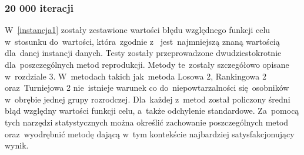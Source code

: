 \subsubsection{20 000 iteracji}
\par
W~\ref{instancja1} zostały zestawione wartości błędu względnego funkcji celu w~stosunku do~wartości, która~zgodnie z~\cite{qaplib} jest~najmniejszą znaną wartością dla~danej instancji danych. Testy zostały przeprowadzone dwudziestokrotnie dla~poszczególnych metod reprodukcji. Metody te~zostały szczegółowo opisane w~rozdziale 3. W~metodach takich jak~metoda Losowa 2, Rankingowa 2 oraz~Turniejowa 2 nie~istnieje warunek co do~niepowtarzalności się~osobników w~obrębie jednej grupy rozrodczej. Dla~każdej z~metod został policzony średni błąd względny wartości funkcji celu, a~także odchylenie standardowe. Za~pomocą tych narzędzi statystycznych można określić zachowanie poszczególnych metod oraz~wyodrębnić metodę dającą w~tym kontekście najbardziej satysfakcjonujący wynik.\\
\par
